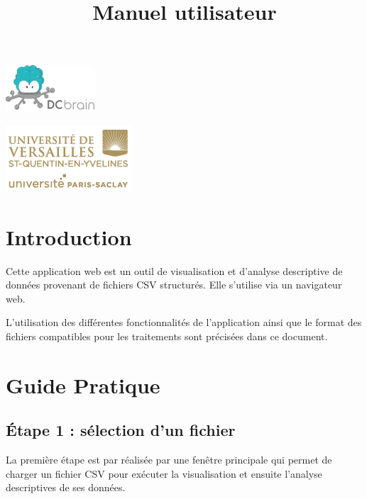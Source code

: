 

\title{\vspace{\fill}\textbf{\Huge Manuel utilisateur}}


\clearpage
\maketitle\vspace{9em}
\begin{center}\includegraphics[scale=3]{dcbrain.png}\end{center}
\begin{center}\includegraphics[scale=0.7]{../Cahier/logo.png}\end{center}
\newpage
\tableofcontents
\newpage\clearpage{}

\section{Introduction}
	Cette application web est un outil de visualisation et d'analyse descriptive de données provenant de fichiers CSV structurés. Elle s'utilise via un navigateur web.
	
	L'utilisation des différentes fonctionnalités de l'application ainsi que le format des fichiers compatibles pour les traitements sont précisées dans ce document.
	
\section{Guide Pratique}
	\subsection{Étape 1 : sélection d'un fichier}
		La première étape est par réalisée par une fenêtre principale qui permet de charger un fichier CSV pour exécuter la visualisation et ensuite l'analyse descriptives de ses données. 
		
